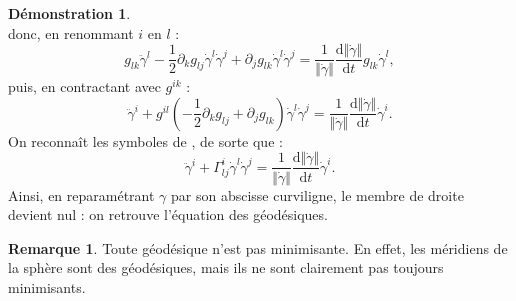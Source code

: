 \documentclass[12pt,a4paper]{article}
\theoremstyle{definition}
\newtheorem{rqe}[thm]{Remarque}
\newtheorem*{dem}{Démonstration}
\begin{document}
\begin{dem}
$$$$
donc, en renommant $i$ en $l$ :
$$g_{lk}\ddot{\gamma}^l-\dfrac{1}{2}\partial_kg_{lj}\dot{\gamma}^l\dot{\gamma}^j+\partial_jg_{lk}\dot{\gamma}^l\dot{\gamma}^j=\dfrac{1}{\Vert\dot{\gamma}\Vert}\dfrac{\mathrm{d}\Vert\dot{\gamma}\Vert}{\mathrm{d}t}g_{lk}\dot{\gamma}^l,$$
puis, en contractant avec $g^{ik}$ :
$$
\ddot{\gamma}^i+g^{il}\left(-\dfrac{1}{2}\partial_kg_{lj}+\partial_jg_{lk}\right)\dot{\gamma}^l\dot{\gamma}^j=\dfrac{1}{\Vert\dot{\gamma}\Vert}\dfrac{\mathrm{d}\Vert\dot{\gamma}\Vert}{\mathrm{d}t}\dot{\gamma}^i.
$$
On reconnaît les symboles de , de sorte que :
$$
\ddot{\gamma}^i+\Gamma_{lj}^i\dot{\gamma}^l\dot{\gamma}^j=\dfrac{1}{\Vert\dot{\gamma}\Vert}\dfrac{\mathrm{d}\Vert\dot{\gamma}\Vert}{\mathrm{d}t}\dot{\gamma}^i.
$$
Ainsi, en reparamétrant $\gamma$ par son abscisse curviligne, le membre de droite devient nul : on retrouve l'équation des géodésiques.
\end{dem}
\begin{rqe}
Toute géodésique n'est pas minimisante. En effet, les méridiens de la sphère sont des géodésiques, mais ils ne sont clairement pas toujours minimisants.
\end{rqe}
\end{document}
